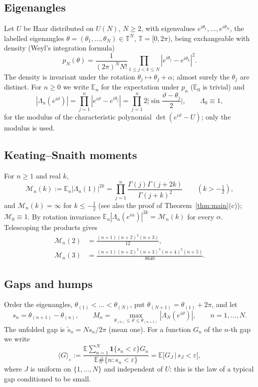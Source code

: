 \documentclass[12pt]{amsart}
\theoremstyle{remark}
\newcommand{\E}{\mathbb{E}}
\newcommand{\eps}{\varepsilon}
\newcommand{\T}{\mathbb{T}}
\newcommand{\1}{\mathbf{1}}
\begin{document}
\subsection*{Eigenangles}
Let $U$ be Haar distributed on $U(N)$, $N\ge2$, with eigenvalues
$e^{i\theta_1},\dots,e^{i\theta_N}$, the labelled eigenangles
$\theta=(\theta_1,\dots,\theta_N)\in\T^N$, $\T=[0,2\pi)$, being
exchangeable with density (Weyl's integration formula)
\begin{equation}\label{eq:weyl}
p_N(\theta)=\frac{1}{(2\pi)^N N!}\prod_{1\le j<k\le N}
|e^{i\theta_j}-e^{i\theta_k}|^2 .
\end{equation}
The density is invariant under the rotation
$\theta_j\mapsto\theta_j+\alpha$; almost surely the $\theta_j$ are
distinct. For $n\ge0$ we write $\E_n$ for the expectation under
$p_n$ ($\E_0$ is trivial) and
\[
|\Lambda_n(e^{i\vartheta})| = \prod_{j=1}^n|e^{i\vartheta}-e^{i\theta_j}|
=\prod_{j=1}^n 2\Big|\sin\frac{\vartheta-\theta_j}{2}\Big|,
\qquad \Lambda_0\equiv1,
\]
for the modulus of the characteristic polynomial $\det(e^{i\vartheta}-U)$;
only the modulus is used.

\subsection*{Keating--Snaith moments}
For $n\ge1$ and real $k$,
\begin{equation}\label{eq:KS}
\mathcal M_n(k):=\E_n|\Lambda_n(1)|^{2k}
=\prod_{j=1}^n\frac{\Gamma(j)\Gamma(j+2k)}{\Gamma(j+k)^2}
\qquad (k>-\tfrac12),
\end{equation}
and $\mathcal M_n(k)=\infty$ for $k\le-\frac12$ \cite{KS00} (see also the
proof of Theorem~\ref{thm:main}(c)); $\mathcal M_0\equiv1$. By rotation
invariance $\E_n|\Lambda_n(e^{i\alpha})|^{2k}=\mathcal M_n(k)$ for every
$\alpha$. Telescoping the products gives
\begin{equation}\label{eq:M23}
\begin{aligned}
\mathcal M_n(2)&=\frac{(n+1)(n+2)^2(n+3)}{12},\\
\mathcal M_n(3)&=\frac{(n+1)(n+2)^2(n+3)^3(n+4)^2(n+5)}{8640}.
\end{aligned}
\end{equation}

\subsection*{Gaps and humps}
Order the eigenangles, $\theta_{(1)}<\dots<\theta_{(N)}$, put
$\theta_{(N+1)}=\theta_{(1)}+2\pi$, and let
\[
s_n=\theta_{(n+1)}-\theta_{(n)},\qquad
M_n=\max_{\theta_{(n)}\le\vartheta\le\theta_{(n+1)}}|\Lambda_N(e^{i\vartheta})|,
\qquad n=1,\dots,N .
\]
The unfolded gap is $\tilde s_n=Ns_n/2\pi$ (mean one). For a function
$G_n$ of the $n$-th gap we write
\begin{equation}\label{eq:palm}
\langle G\rangle_\eps:=\frac{\E\sum_{n=1}^N\1\{s_n<\eps\}G_n}
{\E\#\{n:s_n<\eps\}}=\E\big[G_J\,\big|\,s_J<\eps\big],
\end{equation}
where $J$ is uniform on $\{1,\dots,N\}$ and independent of $U$: this is the
law of a typical gap conditioned to be small.
\end{document}
